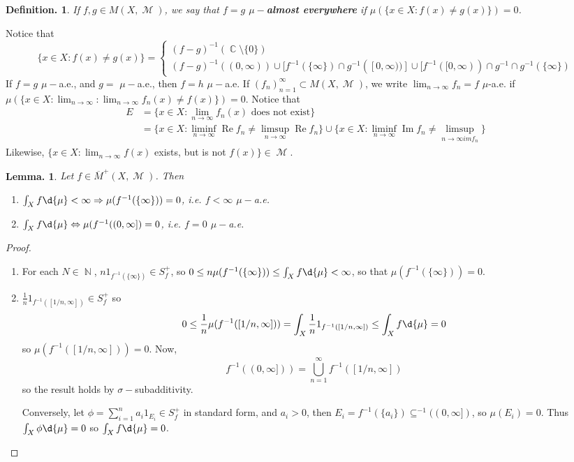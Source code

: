 \documentclass[11pt, a4paper]{memoir}
\DeclareMathOperator{\N}{{\mathbb{N}}}
\DeclareMathOperator{\C}{{\mathbb{C}}}
\theoremstyle{change}
\newtheorem{lemma}[theorem]{Lemma.}
\theoremstyle{plain}
\theoremstyle{nonumberplain}
\newtheorem{definition}{Definition.}
\newtheorem{proof}{Proof}
\DeclareMathOperator{\M}{{\mathcal{M}}}
\renewcommand{\Re}{\ensuremath{\operatorname{Re}}}
\renewcommand{\Im}{\ensuremath{\operatorname{Im}}}
\begin{document}
\begin{definition}
    If $f,g\in M(X,\M)$, we say that $f=g$ \textbf{$\mu-$almost everywhere} if $\mu(\{x\in X:f(x)\neq g(x)\})=0$.
\end{definition}
Notice that
\begin{equation*}
    \{x\in X:f(x)\neq g(x)\}=
    \begin{cases}
        (f-g)^{-1}(\C\setminus\{0\})\\
        (f-g)^{-1}((0,\infty))\cup[f^{-1}(\{\infty\})\cap g^{-1}([0,\infty))]\cup[f^{-1}([0,\infty))\cap g^{-1}\cap g^{-1}(\{\infty\})
    \end{cases}
\end{equation*}
If $f=g$ $\mu-$a.e., and $g=$ $\mu-$a.e., then $f=h$ $\mu-$a.e.
If $(f_n)_{n=1}^\infty\subset M(X,\M)$, we write $\lim_{n\to\infty}f_n=f$ $\mu$-a.e. if $\mu(\{x\in X:\lim_{n\to\infty}:\lim_{n\to\infty}f_n(x)\neq f(x)\})=0$.
Notice that
\begin{align*}
    E &= \{x\in X:\lim_{n\to\infty}f_n(x)\text{ does not exist}\}\\
      &= \{x\in X:\liminf_{n\to\infty}\Re f_n\neq\limsup_{n\to\infty}\Re f_n\}\cup\{x\in X:\liminf_{n\to\infty}\Im f_n\neq\limsup_{n\to\infty im f_n}\}
\end{align*}
Likewise, $\{x\in X:\lim_{n\to\infty}f(x)$ exists, but is not $f(x)\}\in\M$.
\begin{lemma}
    Let $f\in\overline{M}^+(X,\M)$.
    Then
    \begin{enumerate}[nolistsep]
        \item $\int_X f\d{\mu}<\infty\Rightarrow\mu(f^{-1}(\{\infty\}))=0$, i.e. $f<\infty$ $\mu-$a.e.
        \item $\int_X f\d{\mu}\Leftrightarrow\mu(f^{-1}((0,\infty])=0$, i.e. $f=0$ $\mu-$a.e. %
    \end{enumerate}
\end{lemma}
\begin{proof}
    \begin{enumerate}[nolistsep]
        \item For each $N\in\N$, $n1_{f^{-1}(\{\infty\})}\in S^+_f$, so $0\leq n\mu(f^{-1}(\{\infty\}))\leq\int_X f\d{\mu}<\infty$, so that $\mu(f^{-1}(\{\infty\}))=0$.
        \item $\frac{1}{n}1_{f^{-1}([1/n,\infty])}\in S^+_f$ so
            \begin{equation*}
                0\leq\frac{1}{n}\mu(f^{-1}([1/n,\infty]))=\int_X\frac{1}{n}1_{f^{-1}([1/n,\infty])}\leq\int_X f\d{\mu}=0
            \end{equation*}
            so $\mu(f^{-1}([1/n,\infty]))=0$.
            Now,
            \begin{equation*}
                f^{-1}((0,\infty]))=\bigcup_{n=1}^\infty f^{-1}([1/n,\infty])
            \end{equation*}
            so the result holds by $\sigma-$subadditivity.

            Conversely, let $\phi=\sum_{i=1}^n a_i1_{E_i}\in S^+_f$ in standard form, and $a_i>0$, then $E_i=f^{-1}(\{a_i\})\subseteq ^{-1}((0,\infty])$, so $\mu(E_i)=0$.
            Thus $\int_X\phi\d{\mu}=0$ so $\int_Xf\d{\mu}=0$.
    \end{enumerate}
\end{proof}
\end{document}
